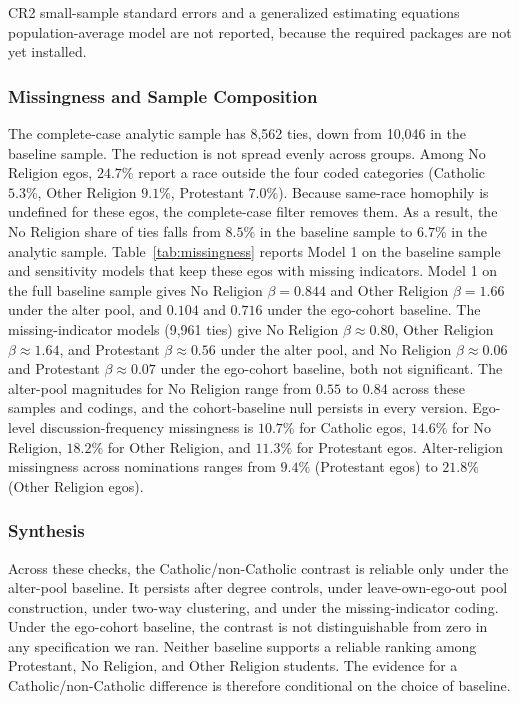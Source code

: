 \documentclass[11pt]{article}
\begin{document}
CR2 small-sample standard errors and a generalized estimating equations population-average model are not reported, because the required packages are not yet installed.

\subsubsection{Missingness and Sample Composition}
\label{sec:missingness}

The complete-case analytic sample has 8,562 ties, down from 10,046 in the baseline sample. The reduction is not spread evenly across groups. Among No Religion egos, $24.7\%$ report a race outside the four coded categories (Catholic $5.3\%$, Other Religion $9.1\%$, Protestant $7.0\%$). Because same-race homophily is undefined for these egos, the complete-case filter removes them. As a result, the No Religion share of ties falls from $8.5\%$ in the baseline sample to $6.7\%$ in the analytic sample. Table~\ref{tab:missingness} reports Model 1 on the baseline sample and sensitivity models that keep these egos with missing indicators. Model 1 on the full baseline sample gives No Religion $\beta = 0.844$ and Other Religion $\beta = 1.66$ under the alter pool, and $0.104$ and $0.716$ under the ego-cohort baseline. The missing-indicator models (9,961 ties) give No Religion $\beta \approx 0.80$, Other Religion $\beta \approx 1.64$, and Protestant $\beta \approx 0.56$ under the alter pool, and No Religion $\beta \approx 0.06$ and Protestant $\beta \approx 0.07$ under the ego-cohort baseline, both not significant. The alter-pool magnitudes for No Religion range from $0.55$ to $0.84$ across these samples and codings, and the cohort-baseline null persists in every version. Ego-level discussion-frequency missingness is $10.7\%$ for Catholic egos, $14.6\%$ for No Religion, $18.2\%$ for Other Religion, and $11.3\%$ for Protestant egos. Alter-religion missingness across nominations ranges from $9.4\%$ (Protestant egos) to $21.8\%$ (Other Religion egos).

\subsubsection{Synthesis}

Across these checks, the Catholic/non-Catholic contrast is reliable only under the alter-pool baseline. It persists after degree controls, under leave-own-ego-out pool construction, under two-way clustering, and under the missing-indicator coding. Under the ego-cohort baseline, the contrast is not distinguishable from zero in any specification we ran. Neither baseline supports a reliable ranking among Protestant, No Religion, and Other Religion students. The evidence for a Catholic/non-Catholic difference is therefore conditional on the choice of baseline.
\end{document}
